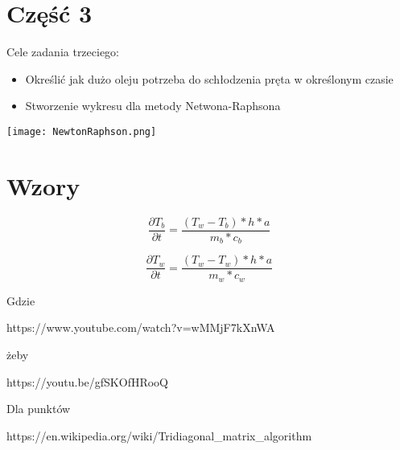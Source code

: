 \documentclass[varwidth,12pt,a4paper]{article}
\begin{document}
\section{Część 3}

Cele zadania trzeciego:

\begin{itemize}
  \item Określić jak dużo oleju potrzeba do schłodzenia pręta w określonym czasie
  \item Stworzenie wykresu dla metody Netwona-Raphsona
\end{itemize}

\texttt{[image: NewtonRaphson.png]} 


\section{Wzory}

\begin{equation}
    \frac{\partial T_b}{\partial t}=\frac{(T_w-T_b)*h*a}{m_b*c_b}
\end{equation}

\begin{equation}
    \frac{\partial T_w}{\partial t}=\frac{(T_w-T_w)*h*a}{m_w*c_w}
\end{equation}

Gdzie 

https://www.youtube.com/watch?v=wMMjF7kXnWA

żeby 

https://youtu.be/gfSKOfHRooQ



Dla punktów 

https://en.wikipedia.org/wiki/Tridiagonal_matrix_algorithm
\end{document}
